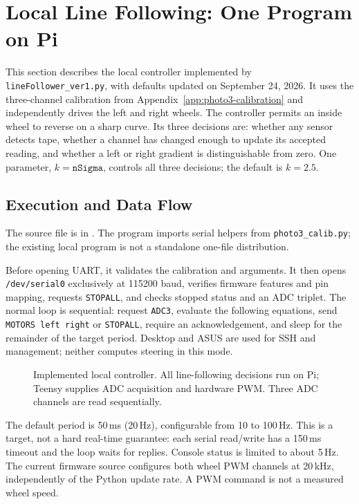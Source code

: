 \clearpage
\section{Local Line Following: One Program on Pi}
\label{app:line-follower}
\label{sec:local-controller}

This section describes the local controller implemented by \texttt{lineFollower\_ver1.py}, with defaults updated on September 24, 2026. It uses the three-channel calibration from Appendix~\ref{app:photo3-calibration} and independently drives the left and right wheels. The controller permits an inside wheel to reverse on a sharp curve. Its three decisions are: whether any sensor detects tape, whether a channel has changed enough to update its accepted reading, and whether a left or right gradient is distinguishable from zero. One parameter, $k=\texttt{nSigma}$, controls all three decisions; the default is $k=2.5$.


\subsection{Execution and Data Flow}
The source file is  in . The program imports serial helpers from \texttt{photo3\_calib.py}; the existing local program is not a standalone one-file distribution.

Before opening UART, it validates the calibration and arguments. It then opens \texttt{/dev/serial0} exclusively at 115200 baud, verifies firmware features and pin mapping, requests \texttt{STOPALL}, and checks stopped status and an ADC triplet. The normal loop is sequential: request \texttt{ADC3}, evaluate the following equations, send \texttt{MOTORS left right} or \texttt{STOPALL}, require an acknowledgement, and sleep for the remainder of the target period. Desktop and ASUS are used for SSH and management; neither computes steering in this mode.

\begin{figure}[H]
\centering

\caption{Implemented local controller. All line-following decisions run on Pi; Teensy supplies ADC acquisition and hardware PWM. Three ADC channels are read sequentially.}
\label{fig:local-controller}
\end{figure}

The default period is 50\,ms (20\,Hz), configurable from 10 to 100\,Hz. This is a target, not a hard real-time guarantee: each serial read/write has a 150\,ms timeout and the loop waits for replies. Console status is limited to about 5\,Hz. The current firmware source configures both wheel PWM channels at 20\,kHz, independently of the Python update rate. A PWM command is not a measured wheel speed.

